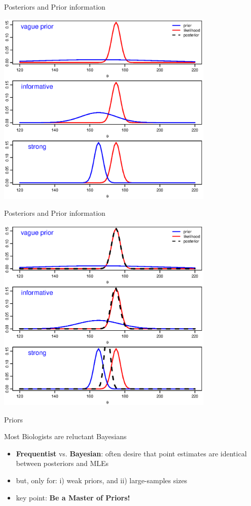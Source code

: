 \documentclass[presentation,9pt,xcolor=dvipsnames]{beamer}
\begin{document}
\begin{frame}[label={sec:org7a50a7c}]{Posteriors and Prior information}
\begin{center}
\includegraphics[width=0.78\textwidth,height=0.78\textheight]{priorinfro_2a.eps}
\end{center}
\end{frame}
\begin{frame}[label={sec:orgfb45d90}]{Posteriors and Prior information}
\begin{center}
\includegraphics[width=0.78\textwidth,height=0.78\textheight]{priorinfro_2b.eps}
\end{center}
\end{frame}
\begin{frame}[label={sec:org12a45c1}]{Priors}
\begin{block}{Most Biologists are reluctant Bayesians}
\begin{itemize}
\item \textbf{Frequentist} vs. \textbf{Bayesian}: often desire that point estimates are identical between posteriors and MLEs
\item \alert{but}, only for: i) weak priors, and ii) large-samples sizes
\item key point: \textbf{Be a Master of Priors!}
\end{itemize}
\end{block}
\end{frame}
\end{document}
